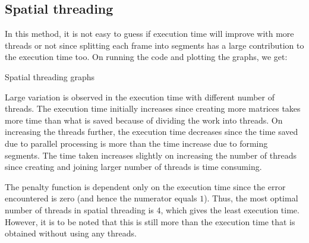 \documentclass{article}
\begin{document}
\subsection{Spatial threading}
In this method, it is not easy to guess if execution time will improve with more threads or not since splitting each frame into segments has a large contribution to the execution time too. On running the code and plotting the graphs, we get:
\begin{center}
    Spatial threading graphs
\end{center}
Large variation is observed in the execution time with different number of threads. The execution time initially increases since creating more matrices takes more time than what is saved because of dividing the work into threads. On increasing the threads further, the execution time decreases since the time saved due to parallel processing is more than the time increase due to forming segments. The time taken increases slightly on increasing the number of threads since creating and joining larger number of threads is time consuming.\par
The penalty function is dependent only on the execution time since the error encountered is zero (and hence the numerator equals $1$). Thus, the most optimal number of threads in spatial threading is $4$, which gives the least execution time. However, it is to be noted that this is still more than the execution time that is obtained without using any threads.
\end{document}
